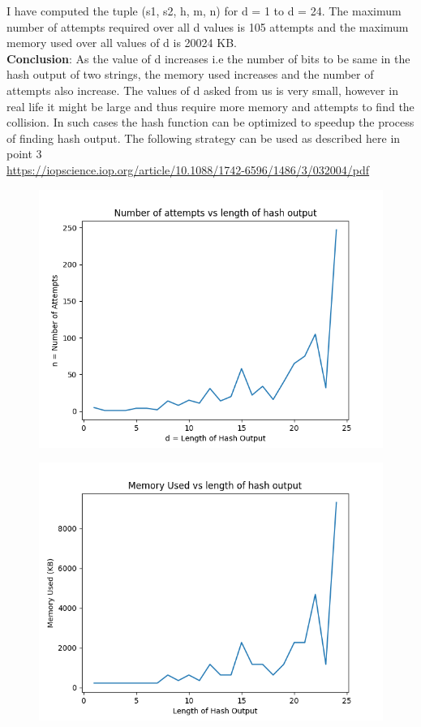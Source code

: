 \documentclass{exam}
\begin{document}
I have computed the tuple (s1, s2, h, m, n) for d = 1 to d = 24. The maximum number of attempts required over all d values is 105 attempts and the maximum memory used over all values of d is 20024 KB. \vspace{0.05in} \\
\textbf{Conclusion}: As the value of d increases i.e the number of bits to be same in the hash output of two strings, the memory used increases and the number of attempts also increase. The values of d asked from us is very small, however in real life it might be large and thus require more memory and attempts to find the collision. In such cases the hash function can be optimized to speedup the process of finding hash output. The following strategy can be used as described here in point 3 \\
\url{https://iopscience.iop.org/article/10.1088/1742-6596/1486/3/032004/pdf}
\begin{figure}[h]
\centering
\includegraphics[scale=0.7]{attempts.png}
\end{figure}
\begin{figure}[h]
\centering
\includegraphics[scale=0.65]{memory.png}
\end{figure}
\end{document}
